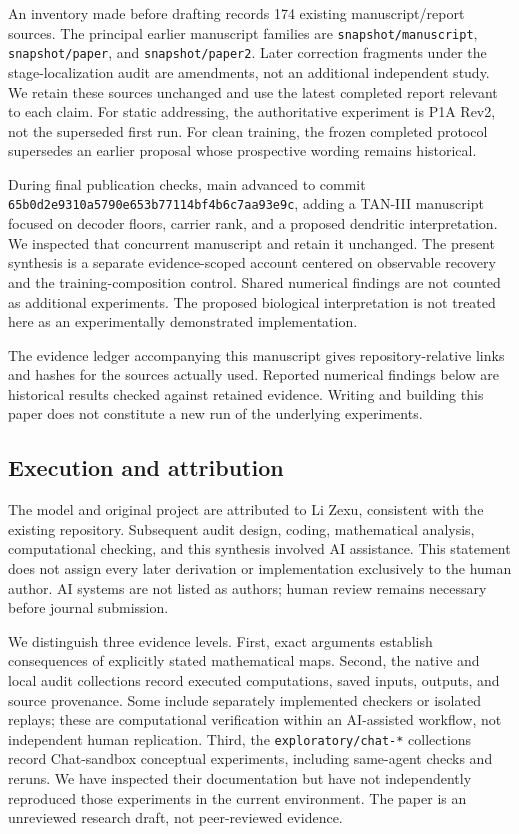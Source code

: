 \documentclass[
  10pt,
]{article}
\begin{document}
An inventory made before drafting records 174 existing manuscript/report
sources. The principal earlier manuscript families are
\texttt{snapshot/manuscript}, \texttt{snapshot/paper}, and
\texttt{snapshot/paper2}. Later correction fragments under the
stage-localization audit are amendments, not an additional independent
study. We retain these sources unchanged and use the latest completed
report relevant to each claim. For static addressing, the authoritative
experiment is P1A Rev2, not the superseded first run. For clean
training, the frozen completed protocol supersedes an earlier proposal
whose prospective wording remains historical.

During final publication checks, main advanced to commit
\texttt{65b0d2e9310a5790e653b77114bf4b6c7aa93e9c}, adding a TAN-III
manuscript focused on decoder floors, carrier rank, and a proposed
dendritic interpretation. We inspected that concurrent manuscript and
retain it unchanged. The present synthesis is a separate evidence-scoped
account centered on observable recovery and the training-composition
control. Shared numerical findings are not counted as additional
experiments. The proposed biological interpretation is not treated here
as an experimentally demonstrated implementation.

The evidence ledger accompanying this manuscript gives
repository-relative links and hashes for the sources actually used.
Reported numerical findings below are historical results checked against
retained evidence. Writing and building this paper does not constitute a
new run of the underlying experiments.

\subsection{Execution and attribution}\label{execution-and-attribution}

The model and original project are attributed to Li Zexu, consistent
with the existing repository. Subsequent audit design, coding,
mathematical analysis, computational checking, and this synthesis
involved AI assistance. This statement does not assign every later
derivation or implementation exclusively to the human author. AI systems
are not listed as authors; human review remains necessary before journal
submission.

We distinguish three evidence levels. First, exact arguments establish
consequences of explicitly stated mathematical maps. Second, the native
and local audit collections record executed computations, saved inputs,
outputs, and source provenance. Some include separately implemented
checkers or isolated replays; these are computational verification
within an AI-assisted workflow, not independent human replication.
Third, the \texttt{exploratory/chat-*} collections record Chat-sandbox
conceptual experiments, including same-agent checks and reruns. We have
inspected their documentation but have not independently reproduced
those experiments in the current environment. The paper is an unreviewed
research draft, not peer-reviewed evidence.
\end{document}
